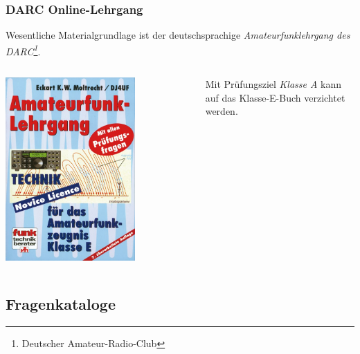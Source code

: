 \begin{frame}
    \frametitle{DARC Online-Lehrgang}

    Wesentliche Materialgrundlage ist der deutschsprachige
    \emph{Amateurfunklehrgang\hyperlink{refs}{\cite{darc}} des
    DARC\footnote{Deutscher Amateur-Radio-Club}}.

    \begin{columns}[c]
        \column[c]{5cm}
        \begin{center}
            \includegraphics[width=0.7\textwidth]{e00/Amateurfunklehrgang-Technik-fuer-das-Amateurfunkzeugnis-Klasse-E.jpg}
            \tiny \hyperlink{refs}{\cite{darcv}}
        \end{center}
        \column{5cm}
            Mit Prüfungsziel \emph{Klasse A} kann auf das Klasse-E-Buch
            verzichtet werden.
    \end{columns}

\end{frame}

\subsection{Fragenkataloge}

